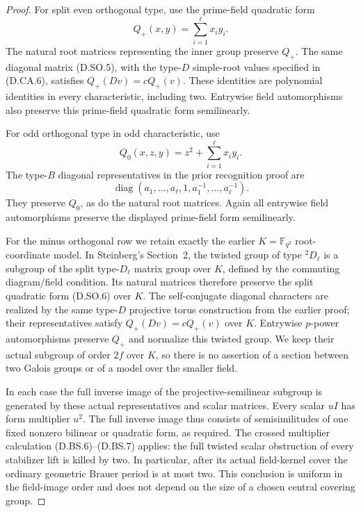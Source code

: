 \begin{proof}
For split even orthogonal type, use the prime-field
quadratic form
\[
                  Q_+(x,y)=\sum_{i=1}^{\ell}x_i y_i.
                                                               \tag{D.SO.6}
\]
The natural root matrices representing the inner
group preserve $Q_+$. The same diagonal matrix
(D.SO.5), with the type-$D$ simple-root values
specified in (D.CA.6), satisfies
$Q_+(Dv)=cQ_+(v)$. These identities are polynomial
identities in every characteristic, including two.
Entrywise field automorphisms also preserve this
prime-field quadratic form semilinearly.

For odd orthogonal type in odd characteristic,
use
\[
                  Q_0(x,z,y)=z^2+\sum_{i=1}^{\ell}x_i y_i.
                                                               \tag{D.SO.7}
\]
The type-$B$ diagonal representatives in the prior
recognition proof are
\[
 \operatorname{diag}(a_1,\ldots,a_\ell,1,
                         a_1^{-1},\ldots,a_\ell^{-1}).
\]
They preserve $Q_0$, as do the natural root matrices.
Again all entrywise field automorphisms preserve
the displayed prime-field form semilinearly.

For the minus orthogonal row we retain exactly the
earlier $K=\mathbb F_{q^2}$ root-coordinate model.
In Steinberg's Section~2, the twisted group of
type ${}^2D_\ell$ is a subgroup of the split
type-$D_\ell$ matrix group over $K$, defined by
the commuting diagram/field condition. Its
natural matrices therefore preserve the split
quadratic form (D.SO.6) over $K$.
The self-conjugate diagonal characters are realized
by the same type-$D$ projective torus construction
from the earlier proof; their representatives
satisfy $Q_+(Dv)=cQ_+(v)$ over $K$.
Entrywise $p$-power automorphisms preserve $Q_+$
and normalize this twisted group. We keep their
actual subgroup of order $2f$ over $K$, so there
is no assertion of a section between two Galois
groups or of a model over the smaller field.

In each case the full inverse image of the
projective-semilinear subgroup is generated by
these actual representatives and scalar matrices.
Every scalar $uI$ has form multiplier $u^2$.
The full inverse image thus consists of
semisimilitudes of one fixed nonzero bilinear
or quadratic form, as required. The crossed
multiplier calculation (D.BS.6)--(D.BS.7) applies:
the full twisted scalar obstruction of every
stabilizer lift is killed by two. In particular,
after its actual field-kernel cover the ordinary
geometric Brauer period is at most two.
This conclusion is uniform in the field-image
order and does not depend on the size of a chosen
central covering group.


\end{proof}
